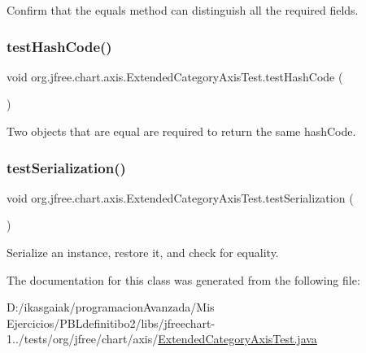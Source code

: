 Confirm that the equals method can distinguish all the required fields. \mbox{\label{classorg_1_1jfree_1_1chart_1_1axis_1_1_extended_category_axis_test_a18c5e1fd8cebaa14d9cdcd6e440f1cbc}} 
\subsubsection{\texorpdfstring{test\+Hash\+Code()}{testHashCode()}}
{\footnotesize\ttfamily void org.\+jfree.\+chart.\+axis.\+Extended\+Category\+Axis\+Test.\+test\+Hash\+Code (\begin{DoxyParamCaption}{ }\end{DoxyParamCaption})}

Two objects that are equal are required to return the same hash\+Code. \mbox{\label{classorg_1_1jfree_1_1chart_1_1axis_1_1_extended_category_axis_test_a7d37143e16ec7a6a8344e8f63ad5b3c0}} 
\subsubsection{\texorpdfstring{test\+Serialization()}{testSerialization()}}
{\footnotesize\ttfamily void org.\+jfree.\+chart.\+axis.\+Extended\+Category\+Axis\+Test.\+test\+Serialization (\begin{DoxyParamCaption}{ }\end{DoxyParamCaption})}

Serialize an instance, restore it, and check for equality. 

The documentation for this class was generated from the following file\+:\begin{DoxyCompactItemize}
\item 
D\+:/ikasgaiak/programacion\+Avanzada/\+Mis Ejercicios/\+P\+B\+Ldefinitibo2/libs/jfreechart-\/1../tests/org/jfree/chart/axis/\mbox{\hyperlink{_extended_category_axis_test_8java}{Extended\+Category\+Axis\+Test.\+java}}\end{DoxyCompactItemize}
